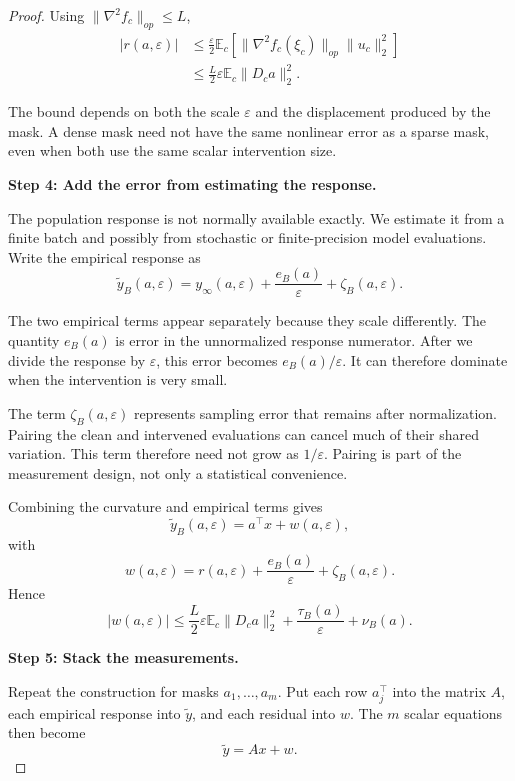 \documentclass[sigconf,10pt,nonacm,balance=false]{acmart}
\newcommand{\eps}{\varepsilon}
\newcommand{\E}{\mathbb{E}}
\begin{document}
\begin{proof}
Using $\|\nabla^2 f_c\|_{op}\le L$,
\begin{equation}
\begin{aligned}
    |r(a,\eps)|
    &\le
    \frac{\eps}{2}
    \E_c\left[
    \|\nabla^2 f_c(\xi_c)\|_{op}
    \|u_c\|_2^2
    \right]\\
    &\le
    \frac{L}{2}\eps
    \E_c\|D_ca\|_2^2.
\end{aligned}
\end{equation}

The bound depends on both the scale $\eps$ and the displacement produced by the mask. A dense mask need not have the same nonlinear error as a sparse mask, even when both use the same scalar intervention size.

\noindent\textbf{Step 4: Add the error from estimating the response.}\par

The population response is not normally available exactly. We estimate it from a finite batch and possibly from stochastic or finite-precision model evaluations. Write the empirical response as
\begin{equation}
    \widetilde y_B(a,\eps)
    =
    y_\infty(a,\eps)
    +\frac{e_B(a)}{\eps}
    +\zeta_B(a,\eps).
\end{equation}

The two empirical terms appear separately because they scale differently. The quantity $e_B(a)$ is error in the unnormalized response numerator. After we divide the response by $\eps$, this error becomes $e_B(a)/\eps$. It can therefore dominate when the intervention is very small.

The term $\zeta_B(a,\eps)$ represents sampling error that remains after normalization. Pairing the clean and intervened evaluations can cancel much of their shared variation. This term therefore need not grow as $1/\eps$. Pairing is part of the measurement design, not only a statistical convenience.

Combining the curvature and empirical terms gives
\begin{equation}
    \widetilde y_B(a,\eps)
    =
    a^\top x+w(a,\eps),
\end{equation}
with
\begin{equation}
    w(a,\eps)
    =
    r(a,\eps)
    +\frac{e_B(a)}{\eps}
    +\zeta_B(a,\eps).
\end{equation}
Hence
\begin{equation}
    |w(a,\eps)|
    \le
    \frac{L}{2}\eps\E_c\|D_ca\|_2^2
    +\frac{\tau_B(a)}{\eps}
    +\nu_B(a).
\end{equation}

\noindent\textbf{Step 5: Stack the measurements.}\par

Repeat the construction for masks $a_1,\ldots,a_m$. Put each row $a_j^\top$ into the matrix $A$, each empirical response into $\widetilde y$, and each residual into $w$. The $m$ scalar equations then become
\begin{equation}
    \widetilde y=Ax+w.
\end{equation}

\end{proof}
\end{document}
